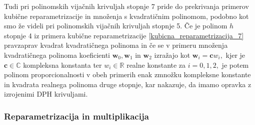 \documentclass[12pt,a4paper,twoside]{article}
\theoremstyle{definition} %
\theoremstyle{plain} %
\theoremstyle{primerstyle}
\numberwithin{equation}{section}  %
\newcommand{\R}{\mathbb R}
\renewcommand{\C}{\mathbb C}
\newcommand{\cV}{\mathbf{c}}
\newcommand{\wV}{\mathbf{w}}
\begin{document}
Tudi pri polinomskih vijačnih krivuljah stopnje 7 pride do prekrivanja primerov kubične reparametrizacije in množenja s kvadratičnim polinomom, podobno kot smo že videli pri polinomskih vijačnih krivuljah stopnje 5. Če je polinom $h$ stopnje 4 iz primera kubične reparametrizacije \ref{kubicna_reparametrizacija_7} pravzaprav kvadrat kvadratičnega polinoma in če se v primeru množenja kvadratičnega polinoma koeficienti $\wV_0,\wV_1$ in $\wV_2$ izražajo kot $\wV_i=\cV w_i,$ kjer je $\cV\in\C$ kompleksna konstanta ter $w_i\in\R$ realne konstante za $i=0,1,2,$ je potem polinom proporcionalnosti v obeh primerih enak zmnožku kompleksne konstante in kvadrata realnega polinoma druge stopnje, kar nakazuje, da imamo opravka z izrojenimi DPH krivuljami.

\subsubsection{Reparametrizacija in multiplikacija}
\label{reparametrizacija_multiplikacija}
\end{document}
